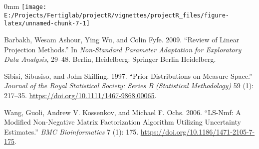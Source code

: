 \documentclass[]{article}
\newcommand{\hlnum}[1]{\textcolor[rgb]{0.816,0.125,0.439}{#1}}%
\newcommand{\hlstr}[1]{\textcolor[rgb]{0.251,0.627,0.251}{#1}}%
\newcommand{\hlcom}[1]{\textcolor[rgb]{0.502,0.502,0.502}{\textit{#1}}}%
\newcommand{\hlopt}[1]{\textcolor[rgb]{0,0,0}{#1}}%
\newcommand{\hlstd}[1]{\textcolor[rgb]{0.251,0.251,0.251}{#1}}%
\newcommand{\hlkwc}[1]{\textcolor[rgb]{0.251,0.251,0.251}{#1}}%
\newcommand{\hlkwd}[1]{\textcolor[rgb]{0.878,0.439,0.125}{#1}}%
\newenvironment{Shaded}{\begin{myshaded}}{\end{myshaded}}
\newcommand{\KeywordTok}[1]{\hlkwd{#1}}
\newcommand{\DataTypeTok}[1]{\hlkwc{#1}}
\newcommand{\DecValTok}[1]{\hlnum{#1}}
\newcommand{\StringTok}[1]{\hlstr{#1}}
\newcommand{\CommentTok}[1]{\hlcom{#1}}
\newcommand{\OperatorTok}[1]{\hlopt{#1}}
\newcommand{\NormalTok}[1]{\hlstd{#1}}
\begin{document}
\begin{Shaded}
\end{Shaded}

\begin{adjustwidth}{\fltoffset}{0mm}
\texttt{[image: E:/Projects/Fertiglab/projectR/vignettes/projectR\_files/figure-latex/unnamed-chunk-7-1]} \end{adjustwidth}

\hypertarget{refs}{}
\begin{cslreferences}
\leavevmode\hypertarget{ref-Barbakh:2009bw}{}%
Barbakh, Wesam Ashour, Ying Wu, and Colin Fyfe. 2009. ``Review of Linear Projection Methods.'' In \emph{Non-Standard Parameter Adaptation for Exploratory Data Analysis}, 29--48. Berlin, Heidelberg: Springer Berlin Heidelberg.

\leavevmode\hypertarget{ref-Sibisi1997}{}%
Sibisi, Sibusiso, and John Skilling. 1997. ``Prior Distributions on Measure Space.'' \emph{Journal of the Royal Statistical Society: Series B (Statistical Methodology)} 59 (1): 217--35. \url{https://doi.org/10.1111/1467-9868.00065}.

\leavevmode\hypertarget{ref-Ochs2006}{}%
Wang, Guoli, Andrew V. Kossenkov, and Michael F. Ochs. 2006. ``LS-Nmf: A Modified Non-Negative Matrix Factorization Algorithm Utilizing Uncertainty Estimates.'' \emph{BMC Bioinformatics} 7 (1): 175. \url{https://doi.org/10.1186/1471-2105-7-175}.
\end{cslreferences}
\end{document}
